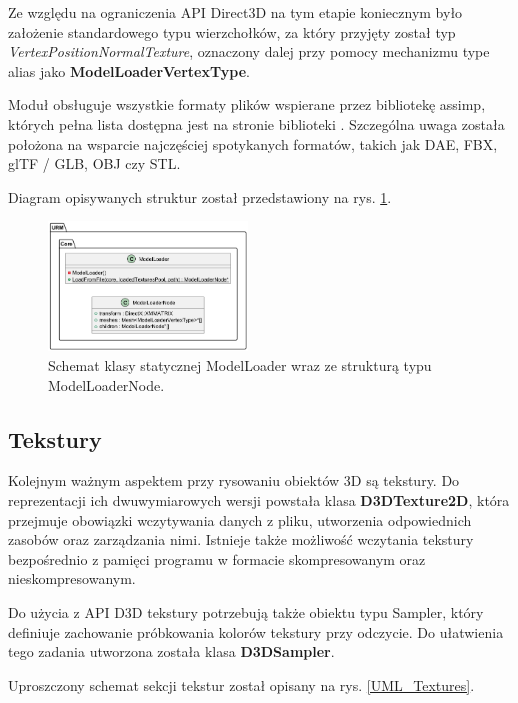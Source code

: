 	Ze względu na ograniczenia API Direct3D na tym etapie koniecznym było założenie standardowego typu wierzchołków, za który przyjęty został typ \textit{VertexPositionNormalTexture}, oznaczony dalej przy pomocy mechanizmu type alias jako \textbf{ModelLoaderVertexType}.
	
	Moduł obsługuje wszystkie formaty plików wspierane przez bibliotekę assimp, których pełna lista dostępna jest na stronie biblioteki \cite{github:assimp:FileFormats}. Szczególna uwaga została położona na wsparcie najczęściej spotykanych formatów, takich jak DAE, FBX, glTF / GLB, OBJ czy STL.
	
	Diagram opisywanych struktur został przedstawiony na rys. \ref{UML_ModelLoader}.
		
	\begin{figure}[h!]
		\centering
		\includegraphics[width=200px]{images/UML/modelloader.png}
		\caption{Schemat klasy statycznej ModelLoader wraz ze strukturą typu ModelLoaderNode.}
		\label{UML_ModelLoader}
	\end{figure}

\subsection{Tekstury}
	Kolejnym ważnym aspektem przy rysowaniu obiektów 3D są tekstury. Do reprezentacji ich dwuwymiarowych wersji powstała klasa \textbf{D3DTexture2D}, która przejmuje obowiązki wczytywania danych z pliku, utworzenia odpowiednich zasobów oraz zarządzania nimi. Istnieje także możliwość wczytania tekstury bezpośrednio z pamięci programu w formacie skompresowanym oraz nieskompresowanym.
	
	Do użycia z API D3D tekstury potrzebują także obiektu typu Sampler, który definiuje zachowanie próbkowania kolorów tekstury przy odczycie. Do ułatwienia tego zadania utworzona została klasa \textbf{D3DSampler}.
	
	Uproszczony schemat sekcji tekstur został opisany na rys. \ref{UML_Textures}.
	
